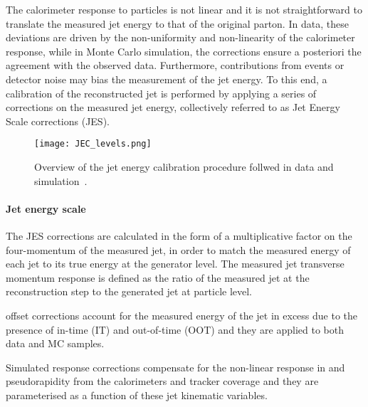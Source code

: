 The calorimeter response to particles is not linear and it is not straightforward to translate the measured jet energy
to that of the original parton.
In data, these deviations are driven by the non-uniformity and non-linearity of the calorimeter response,
while in Monte Carlo simulation, the corrections ensure a posteriori the agreement with the observed data.
Furthermore, contributions from \pileup{} events or detector noise may bias the measurement of the jet energy.
To this end, a calibration of the reconstructed jet is performed by applying a series of corrections on the measured jet energy,
collectively referred to as Jet Energy Scale corrections (JES).

\begin{figure}
\centering
\texttt{[image: JEC\_levels.png]}
\caption{Overview of the jet energy calibration procedure follwed in data and simulation~\cite{CMS-JME-13-004}.}
\label{fig:JECoverview}
\end{figure}


\paragraph{Jet energy scale\\}
The JES corrections are calculated in the form of a multiplicative factor on the four-momentum of the measured jet,
in order to match the measured energy of each jet to its true energy at the generator level.
The measured jet transverse momentum response is defined as the ratio of the measured jet \pt at the reconstruction step to the generated jet at particle level.

\Pileup{} offset corrections account for the measured energy of the jet in excess due to
the presence of in-time (IT) and out-of-time (OOT) \pileup{}
and they are applied to both data and MC samples.

Simulated response corrections compensate for the non-linear response in \pt and pseudorapidity
from the calorimeters and tracker coverage and they are parameterised as a function of these jet kinematic variables.

